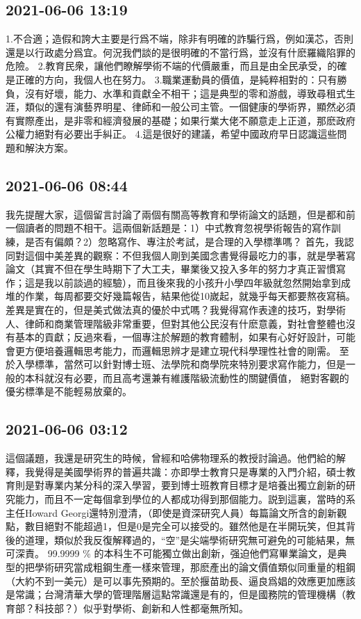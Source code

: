 \documentclass[twocolumn]{ctexart}
\begin{document}
\subsection*{2021-06-06 13:19}

1.不合適；造假和誇大主要是行爲不端，除非有明確的詐騙行爲，例如漢芯，否則還是以行政處分爲宜。何況我們談的是很明確的不當行爲，並沒有什麽羅織陷罪的危險。
2.教育民衆，讓他們瞭解學術不端的代價嚴重，而且是由全民承受，的確是正確的方向，我個人也在努力。
3.職業運動員的價值，是純粹相對的：只有勝負，沒有好壞，能力、水準和貢獻全不相干；這是典型的零和游戲，導致尋租式生涯，類似的還有演藝界明星、律師和一般公司主管。一個健康的學術界，顯然必須有實際產出，是非零和經濟發展的基礎；如果行業大佬不願意走上正道，那麽政府公權力絕對有必要出手糾正。
4.這是很好的建議，希望中國政府早日認識這些問題和解決方案。
\subsection*{2021-06-06 08:44}

我先提醒大家，這個留言討論了兩個有關高等教育和學術論文的話題，但是都和前一個讀者的問題不相干。這兩個新話題是：1）中式教育忽視學術報告的寫作訓練，是否有偏頗？2）忽略寫作、專注於考試，是合理的入學標準嗎？
首先，我認同對這個中美差異的觀察：不但我個人剛到美國念書覺得最吃力的事，就是學著寫論文（其實不但在學生時期下了大工夫，畢業後又投入多年的努力才真正習慣寫作；這是我以前談過的經驗），而且後來我的小孩升小學四年級就忽然開始拿到成堆的作業，每周都要交好幾篇報告，結果他從10嵗起，就幾乎每天都要熬夜寫稿。
差異是實在的，但是美式做法真的優於中式嗎？我覺得寫作表達的技巧，對學術人、律師和商業管理階級非常重要，但對其他公民沒有什麽意義，對社會整體也沒有基本的貢獻；反過來看，一個專注於解題的教育體制，如果有心好好設計，可能會更方便培養邏輯思考能力，而邏輯思辨才是建立現代科學理性社會的剛需。
至於入學標準，當然可以針對博士班、法學院和商學院來特別要求寫作能力，但是一般的本科就沒有必要，而且高考還兼有維護階級流動性的關鍵價值， 絕對客觀的優劣標準是不能輕易放棄的。
\subsection*{2021-06-06 03:12}

這個議題，我還是研究生的時候，曾經和哈佛物理系的教授討論過。他們給的解釋，我覺得是美國學術界的普遍共識：亦即學士教育只是專業的入門介紹，碩士教育則是對專業内某分科的深入學習，要到博士班教育目標才是培養出獨立創新的研究能力，而且不一定每個拿到學位的人都成功得到那個能力。説到這裏，當時的系主任Howard Georgi還特別澄清，（即使是資深研究人員）每篇論文所含的創新觀點，數目絕對不能超過1，但是0是完全可以接受的。雖然他是在半開玩笑，但其背後的道理，類似於我反復解釋過的，“空”是尖端學術研究無可避免的可能結果，無可深責。
99.9999 \% 的本科生不可能獨立做出創新，强迫他們寫畢業論文，是典型的把學術研究當成粗鋼生產一樣來管理，那麽產出的論文價值類似同重量的粗鋼（大約不到一美元）是可以事先預期的。至於揠苗助長、逼良爲娼的效應更加應該是常識；台灣清華大學的管理階層這點常識還是有的，但是國務院的管理機構（教育部？科技部？）似乎對學術、創新和人性都毫無所知。
\end{document}
